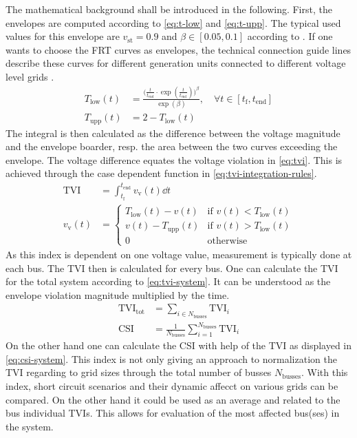 The mathematical background shall be introduced in the following.
First, the envelopes are computed according to \autoref{eq:t-low} and \autoref{eq:t-upp}.
The typical used values for this envelope are $v_\mathrm{st}=0.9$ and $\beta \in [0.05,0.1]$ according to \textcite{wildenhues_2015}.
If one wants to choose the \acs{FRT} curves as envelopes, the technical connection guide lines describe these curves for different generation units connected to different voltage level grids \autocite{vde-tar_2018,vde-tar_2023}.
\begin{align}
    T_\mathrm{low}(t) &= \frac{\bigg(\frac{t}{t_\mathrm{end}} \cdot \exp(\frac{t}{t_\mathrm{end}})\bigg)^\beta}{\exp(\beta)},\quad \forall t \in [t_\mathrm{f}, t_\mathrm{end}] \label{eq:t-low} \\[12pt]
    T_\mathrm{upp}(t) &= 2-T_\mathrm{low}(t) \label{eq:t-upp}
\end{align}
The integral is then calculated as the difference between the voltage magnitude and the envelope boarder, resp. the area between the two curves exceeding the envelope.
The voltage difference equates the voltage violation in \autoref{eq:tvi}.
This is achieved through the case dependent function in \autoref{eq:tvi-integration-rules}.
\begin{align}
    \text{TVI} &= \int_{t_\mathrm{f}}^{t_\mathrm{end}} v_\mathrm{v}(t) \dd{t} \label{eq:tvi}\\[12pt]
    v_\mathrm{v}(t) &= \begin{cases}
            T_\mathrm{low}(t) - v(t) & \text{if } v(t) < T_\mathrm{low}(t)\\
            v(t) - T_\mathrm{upp}(t) & \text{if } v(t) > T_\mathrm{low}(t)\\
            0 & \text{otherwise}
    \end{cases} \label{eq:tvi-integration-rules}
\end{align}
As this index is dependent on one voltage value, measurement is typically done at each bus.
The \acs{TVI} then is calculated for every bus.
One can calculate the \acs{TVI} for the total system according to \autoref{eq:tvi-system}.
It can be understood as the envelope violation magnitude multiplied by the time.
\begin{align}
    \text{TVI}_\mathrm{tot} &= \sum_{i \in N_\mathrm{busses}} \text{TVI}_i \label{eq:tvi-system} \\[12pt]
    \text{CSI} &= \frac{1}{N_\mathrm{busses}} \sum_{i=1}^{N_\mathrm{busses}} \text{TVI}_i \label{eq:csi-system}
\end{align}
On the other hand one can calculate the \ac{CSI} with help of the \acs{TVI} as displayed in \autoref{eq:csi-system}.
This index is not only giving an approach to normalization the \acs{TVI} regarding to grid sizes through the total number of busses $N_\mathrm{busses}$.
With this index, short circuit scenarios and their dynamic affecct on various grids can be compared.
On the other hand it could be used as an average and related to the bus individual \acsp{TVI}.
This allows for evaluation of the most affected bus(ses) in the system.

